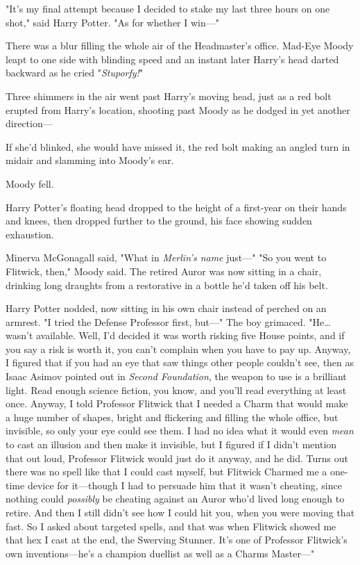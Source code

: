 "It's my final attempt because I decided to stake my last three hours on one
shot," said Harry Potter. "As for whether I win---"

There was a blur filling the whole air of the Headmaster's office. Mad-Eye
Moody leapt to one side with blinding speed and an instant later Harry's head
darted backward as he cried "\emph{Stuporfy!}"

Three shimmers in the air went past Harry's moving head, just as a red bolt
erupted from Harry's location, shooting past Moody as he dodged in yet another
direction---

If she'd blinked, she would have missed it, the red bolt making an angled turn
in midair and slamming into Moody's ear.

Moody fell.

Harry Potter's floating head dropped to the height of a first-year on their
hands and knees, then dropped further to the ground, his face showing sudden
exhaustion.

Minerva McGonagall said, "What in \emph{Merlin's name} just---"
\later
"So you went to Flitwick, then," Moody said. The retired Auror was now sitting
in a chair, drinking long draughts from a restorative in a bottle he'd taken
off his belt.

Harry Potter nodded, now sitting in his own chair instead of perched on an
armrest. "I tried the Defense Professor first, but---" The boy grimaced.
"He{\ldots} wasn't available. Well, I'd decided it was worth risking five House
points, and if you say a risk is worth it, you can't complain when you have to
pay up. Anyway, I figured that if you had an eye that saw things other people
couldn't see, then as Isaac Asimov pointed out in \emph{Second Foundation}, the
weapon to use is a brilliant light. Read enough science fiction, you know, and
you'll read everything at least once. Anyway, I told Professor Flitwick that I
needed a Charm that would make a huge number of shapes, bright and flickering
and filling the whole office, but invisible, so only your eye could see them. I
had no idea what it would even \emph{mean} to cast an illusion and then make it
invisible, but I figured if I didn't mention that out loud, Professor Flitwick
would just do it anyway, and he did. Turns out there was no spell like that I
could cast myself, but Flitwick Charmed me a one-time device for it---though I
had to persuade him that it wasn't cheating, since nothing could
\emph{possibly} be cheating against an Auror who'd lived long enough to retire.
And then I still didn't see how I could hit you, when you were moving that
fast. So I asked about targeted spells, and that was when Flitwick showed me
that hex I cast at the end, the Swerving Stunner. It's one of Professor
Flitwick's own inventions---he's a champion duellist as well as a Charms
Master---"


